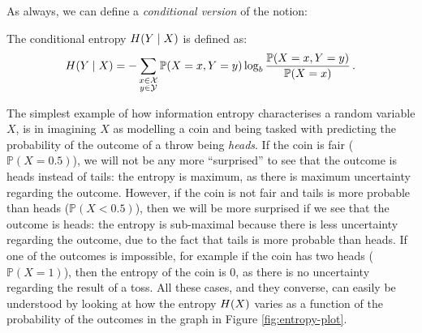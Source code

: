 As always, we can define a \textit{conditional version} of the notion:
\begin{definition} \label{def:conditional-entropy}
	The conditional entropy $H(Y \mid X)$ is defined as:
\begin{equation*}
	H(Y \mid X)=-\sum_{\substack{x \in \mathcal{X} \\ y \in \mathcal{Y}}} \mathbb{P}(X=x,Y=y) \log_{b} \frac{\mathbb{P}(X=x,Y=y)}{\mathbb{P}(X=x)} \,.
\end{equation*}
\end{definition}

The simplest example of how information entropy characterises a random variable $X$, is in imagining $X$ as modelling a coin and being tasked with predicting the probability of the outcome of a throw being \textit{heads}.
If the coin is fair ($\mathbb{P}(X=0.5)$), we will not be any more \enquote{surprised} to see that the outcome is heads instead of tails: the entropy is maximum, as there is maximum uncertainty regarding the outcome.
However, if the coin is not fair and tails is more probable than heads ($\mathbb{P}(X<0.5)$), then we will be more surprised if we see that the outcome is heads: the entropy is sub-maximal because there is less uncertainty regarding the outcome, due to the fact that tails is more probable than heads.
If one of the outcomes is impossible, for example if the coin has two heads ($\mathbb{P}(X=1)$), then the entropy of the coin is $0$, as there is no uncertainty regarding the result of a toss.
All these cases, and they converse, can easily be understood by looking at how the entropy $H(X)$ varies as a function of the probability of the outcomes in the graph in Figure \ref{fig:entropy-plot}.



